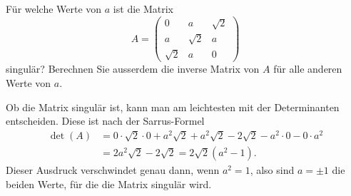 Für welche Werte von $a$ ist die Matrix 
\[
A=\begin{pmatrix}
0&a&\sqrt{2}\\
a&\sqrt{2}&a\\
\sqrt{2}&a&0
\end{pmatrix}
\]
singulär?
Berechnen Sie ausserdem die inverse Matrix von $A$ für alle anderen
Werte von $a$.


\begin{loesung}
Ob die Matrix singulär ist, kann man am leichtesten mit der Determinanten
entscheiden. 
Diese ist nach der Sarrus-Formel
\begin{align*}
\det(A)
&=
0\cdot \sqrt{2}\cdot 0+a^2\sqrt{2}+a^2\sqrt{2}-2\sqrt{2}-a^2\cdot 0 - 0\cdot a^2
\\
&=2a^2\sqrt{2}-2\sqrt{2}=2\sqrt{2}(a^2-1).
\end{align*}
Dieser Ausdruck verschwindet genau dann, wenn $a^2=1$,
also sind $a=\pm1$ die beiden Werte, für die die Matrix singulär wird.


\end{loesung}
